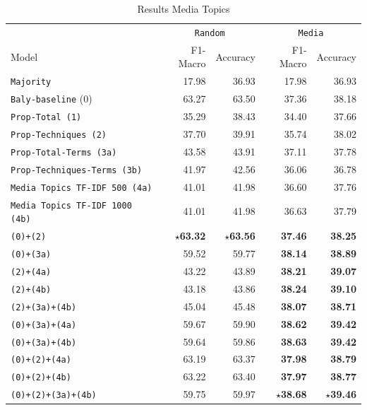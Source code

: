 \begin{table}[!htbp]
    \centering
   \scriptsize
    \begin{tabular}{l|rr|rr}
        & \multicolumn{2}{c}{\texttt{Random}} & \multicolumn{2}{c}{\texttt{Media}} \\
        Model & F1-Macro & Accuracy & F1-Macro & Accuracy \\
        \hline
        \texttt{Majority} & 17.98 & 36.93 & 17.98 & 36.93 \\
        \texttt{Baly-baseline} (0) & 63.27 & 63.50 & 37.36 & 38.18 \\
        \hline
        \texttt{Prop-Total (1)} & 35.29 & 38.43 & 34.40 & 37.66 \\
        \texttt{Prop-Techniques (2)} & 37.70 & 39.91 & 35.74 & 38.02  \\
        \texttt{Prop-Total-Terms (3a)} & 43.58 & 43.91 & 37.11 & 37.78 \\
        \texttt{Prop-Techniques-Terms (3b)} & 41.97 & 42.56 & 36.06 & 36.78 \\
        \hline
        \texttt{Media Topics TF-IDF 500 (4a)} & 41.01 & 41.98 & 36.60 & 37.76 \\
        \texttt{Media Topics TF-IDF 1000 (4b)} & 41.01 & 41.98 & 36.63 & 37.79 \\
        \hline
        \texttt{(0)+(2)} & \textbf{$\star$63.32} & \textbf{$\star$63.56} & \textbf{37.46} & \textbf{38.25}  \\
        \texttt{(0)+(3a)} & 59.52 & 59.77 & \textbf{38.14} & \textbf{38.89}  \\
        \hline
        \texttt{(2)+(4a)} & 43.22 & 43.89 & \textbf{38.21} & \textbf{39.07}  \\
        \texttt{(2)+(4b)} & 43.18 & 43.86 & \textbf{38.24} & \textbf{39.10}  \\
        \texttt{(2)+(3a)+(4b)} & 45.04 & 45.48 & \textbf{38.07} & \textbf{38.71}  \\
        \texttt{(0)+(3a)+(4a)} & 59.67 & 59.90 & \textbf{38.62} & \textbf{39.42}   \\
        \texttt{(0)+(3a)+(4b)} & 59.64 & 59.86 & \textbf{38.63} & \textbf{39.42}  \\
        \texttt{(0)+(2)+(4a)} & 63.19 & 63.37 & \textbf{37.98} & \textbf{38.79}  \\
        \texttt{(0)+(2)+(4b)} & 63.22 & 63.40 & \textbf{37.97} & \textbf{38.77}  \\
        \texttt{(0)+(2)+(3a)+(4b)} & 59.75 & 59.97 & \textbf{$\star$38.68} & \textbf{$\star$39.46}  \\
        
        
    \end{tabular}
    \caption{Results Media Topics}
    \label{tab:results_classifier_with_mediatopics}
\end{table}

